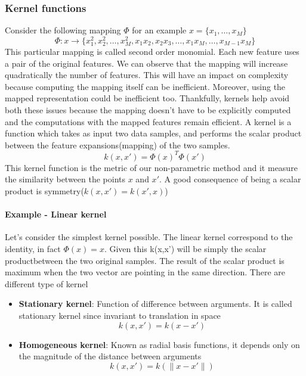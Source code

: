 \documentclass[../main.tex]{subfiles}
\begin{document}
\subsubsection{Kernel functions}
Consider the following mapping $\Phi$ for an example $x=\{x_1, \dots, x_M\}$
\begin{equation*}
    \Phi:x \rightarrow \{x_1^2,x_2^2,\dots,x_M^2,x_1x_2,x_2x_3, \dots,x_1x_M, \dots, x_{M-1}x_M\}
\end{equation*}
This particular mapping is called second order monomial. Each new feature uses a pair of the original features. We can observe that the mapping will increase quadratically the number of features. This will have an impact on complexity because computing the mapping itself can be inefficient. Moreover, using the mapped representation could be inefficient too.
Thankfully, kernels help avoid both these issues because the mapping doesn't have to be explicitly computed and the computations with the mapped features remain efficient.
A kernel is a function which takes as input two data samples, and performs the scalar product between the feature expansions(mapping) of the two samples.
\begin{equation}
    k(x,x') = \Phi(x)^T \Phi(x')
\end{equation}
This kernel function is the metric of our non-parametric method and it measure the similarity between the points $x$ and $x'$. A good consequence of being a scalar product is symmetry($k(x,x') = k(x',x)$)
\paragraph{Example - Linear kernel} Let's consider the simplest kernel possible. The linear kernel correspond to the identity, in fact $\Phi(x) = x$. Given this k(x,x') will be simply the scalar product\footnotemark between the two original samples. The result of the scalar product is maximum when the two vector are pointing in the same direction. 
\newline
There are different type of kernel
\begin{itemize}
    \item \textbf{Stationary kernel}: Function of difference between arguments. It is called stationary kernel since invariant to translation in space
          \begin{equation*}
              k(x,x') = k(x-x')
          \end{equation*}
    \item \textbf{Homogeneous kernel}: Known as radial basis functions, it depends only on the magnitude of the distance between arguments
          \begin{equation*}
              k(x,x') = k(\|x-x'\|)
          \end{equation*}
\end{itemize}
\end{document}
